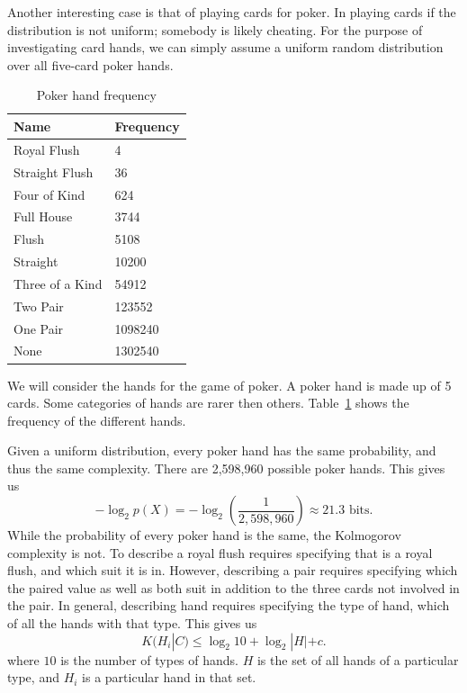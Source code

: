 Another interesting case is that of playing cards for poker.
In playing cards if the distribution is not uniform; somebody is likely cheating.
For the purpose of investigating card hands, we can simply assume a uniform random distribution over all five-card poker hands.

\begin{table}
    \begin{center}
    \begin{tabular}{ll}
        Name & Frequency \\
        \hline
        Royal Flush & 4 \\
        Straight Flush & 36 \\
        Four of Kind & 624 \\
          Full House & 3744 \\
               Flush & 5108 \\
            Straight & 10200 \\
     Three of a Kind & 54912 \\
            Two Pair & 123552 \\
            One Pair & 1098240 \\
            None & 1302540 \\
    \end{tabular}
    \end{center}
    \caption{Poker hand frequency}
    \label{poker}
\end{table}
We will consider the hands for the game of poker.
A poker hand is made up of 5 cards.
Some categories of hands are rarer then others.
Table~\ref{poker} shows the frequency of the different hands.

Given a uniform distribution, every poker hand has the same probability, and thus the same complexity.
There are 2,598,960 possible poker hands. 
This gives us
\begin{equation}
    -\log_2{p(X)} = -\log_2(\frac{1}{2,598,960}) \approx 21.3 \mbox{ bits.}
\end{equation}
While the probability of every poker hand is the same, the Kolmogorov complexity is not.
To describe a royal flush requires specifying that is a royal flush, and which suit it is in.
However, describing a pair requires specifying which the paired value as well as both suit in addition to the three cards not involved in the pair.
In general, describing hand requires specifying the type of hand, which of all the hands with that type.
This gives us
\begin{equation}
    \label{kc.card}
    K(H_i|C) \leq \log_2 10 + \log_2 |H| + c \mbox{.}
\end{equation} where $10$ is the number of types of hands. $H$ is the set of all hands of a particular type, and $H_i$ is a particular hand in that set.

